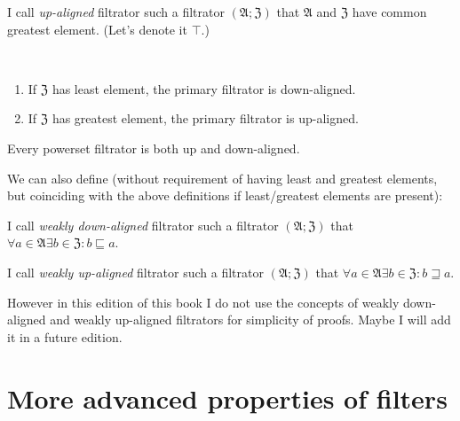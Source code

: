\begin{defn}
I call \emph{up-aligned} filtrator such
a filtrator $(\mathfrak{A};\mathfrak{Z})$ that $\mathfrak{A}$ and
$\mathfrak{Z}$ have common greatest element. (Let's denote it $\top$.)\end{defn}
\begin{obvious}
\label{filt-aligned}~
\begin{enumerate}
\item If $\mathfrak{Z}$ has least element, the primary filtrator is down-aligned.
\item If $\mathfrak{Z}$ has greatest element, the primary filtrator is
up-aligned.
\end{enumerate}
\end{obvious}
\begin{cor}
Every powerset filtrator is both up and down-aligned.
\end{cor}
We can also define (without requirement of having least and greatest
elements, but coinciding with the above definitions if least/greatest
elements are present):
\begin{defn}
I call \emph{weakly down-aligned}
filtrator such a filtrator $(\mathfrak{A};\mathfrak{Z})$ that $\forall a\in\mathfrak{A}\exists b\in\mathfrak{Z}:b\sqsubseteq a$.
\end{defn}

\begin{defn}
I call \emph{weakly up-aligned}
filtrator such a filtrator $(\mathfrak{A};\mathfrak{Z})$ that $\forall a\in\mathfrak{A}\exists b\in\mathfrak{Z}:b\sqsupseteq a$.
\end{defn}
However in this edition of this book I do not use the concepts of
weakly down-aligned and weakly up-aligned filtrators for simplicity
of proofs. Maybe I will add it in a future edition.


\section{More advanced properties of filters}


